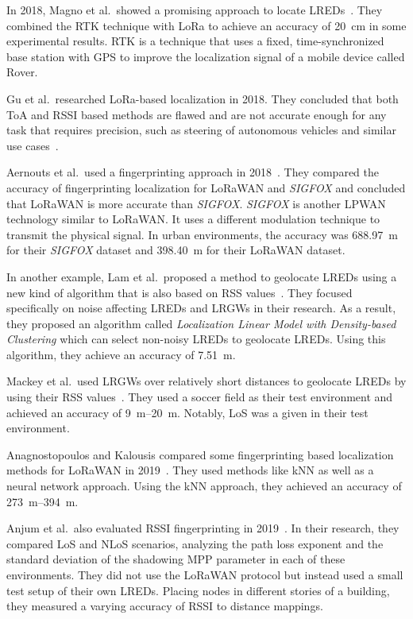 In 2018, Magno et al.\ showed a promising approach to locate \aclp{LRED}~\cite{magno_poster_2018}.
They combined the \acf{RTK} technique with \ac{LoRa} to achieve an accuracy of \SI{20}{\centi\meter} in some experimental results.
\ac{RTK} is a technique that uses a fixed, time-synchronized base station with \ac{GPS} to improve the localization signal of a mobile device called Rover.

Gu et al.\ researched \ac{LoRa}-based localization in 2018.
They concluded that both \ac{ToA} and \ac{RSSI} based methods are flawed and are not accurate enough for any task that requires precision, such as steering of autonomous vehicles and similar use cases~\cite{gu_lora-based_2018}.

Aernouts et al.\ used a fingerprinting approach in 2018~\cite{aernouts_sigfox_2018}.
They compared the accuracy of fingerprinting localization for \ac{LoRaWAN} and \emph{SIGFOX} and concluded that \ac{LoRaWAN} is more accurate than \emph{SIGFOX}.
\emph{SIGFOX} is another \ac{LPWAN} technology similar to \ac{LoRaWAN}.
It uses a different modulation technique to transmit the physical signal.
In urban environments, the accuracy was \SI{688.97}{\meter} for their \emph{SIGFOX} dataset and \SI{398.40}{\meter} for their LoRaWAN dataset.

In another example, Lam et al.~proposed a method to geolocate \aclp{LRED} using a new kind of algorithm that is also based on \ac{RSS} values~\cite{lam_new_2018}.
They focused specifically on noise affecting \aclp{LRED} and \aclp{LRGW} in their research.
As a result, they proposed an algorithm called \emph{Localization Linear Model with Density-based Clustering} which can select non-noisy \aclp{LRED} to geolocate \aclp{LRED}.
Using this algorithm, they achieve an accuracy of \SI{7.51}{\meter}.

Mackey et al.~used \aclp{LRGW} over relatively short distances to geolocate \aclp{LRED} by using their \ac{RSS} values~\cite{mackey_lora-based_2019}.
They used a soccer field as their test environment and achieved an accuracy of \SIrange{9}{20}{\meter}.
Notably, \ac{LoS} was a given in their test environment.

Anagnostopoulos and Kalousis compared some fingerprinting based localization methods for \ac{LoRaWAN} in 2019~\cite{anagnostopoulos_reproducible_2019}.
They used methods like \ac{kNN} as well as a neural network approach.
Using the \ac{kNN} approach, they achieved an accuracy of \SIrange{273}{394}{\meter}.

Anjum et al.\ also evaluated \ac{RSSI} fingerprinting in 2019~\cite{anjum_analysis_2019}.
In their research, they compared \ac{LoS} and \ac{NLoS} scenarios, analyzing the path loss exponent and the standard deviation of the shadowing \ac{MPP} parameter in each of these environments.
They did not use the \ac{LoRaWAN} protocol but instead used a small test setup of their own \aclp{LRED}.
Placing nodes in different stories of a building, they measured a varying accuracy of \ac{RSSI} to distance mappings.

